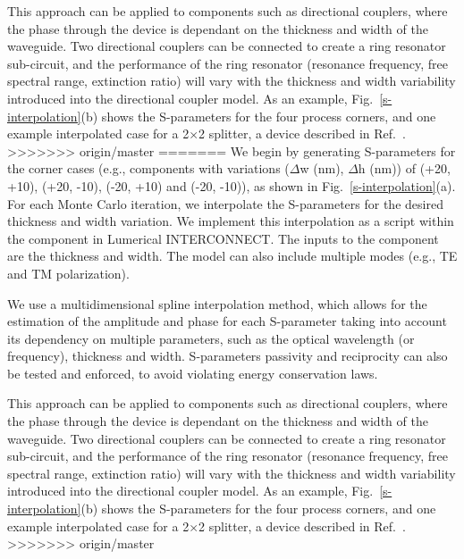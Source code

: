 \documentclass[journal]{spie}
\begin{document}
This approach can be applied to components such as directional couplers, where the phase through the device is dependant on the thickness and width of the waveguide.  Two directional couplers can be connected to create a ring resonator sub-circuit, and the performance of the ring resonator (resonance frequency, free spectral range, extinction ratio) will vary with the thickness and width variability introduced into the directional coupler model.  As an example, Fig.~\ref{s-interpolation}(b) shows the S-parameters for the four process corners, and one example interpolated case for a 2$\times$2 splitter, a device described in Ref.~. 
>>>>>>> origin/master
=======
We begin by generating S-parameters for the corner cases (e.g., components with variations ($\Delta$w (nm), $\Delta$h (nm)) of (+20, +10), (+20, -10), (-20, +10) and (-20, -10)), as shown in Fig.~\ref{s-interpolation}(a).  For each Monte Carlo iteration, we interpolate the S-parameters for the desired thickness and width variation.  We implement this interpolation as a script within the component in Lumerical INTERCONNECT.  The inputs to the component are the thickness and width.
The model can also include multiple modes (e.g., TE and TM polarization).

We use a multidimensional spline interpolation method, which allows for the estimation of the amplitude and phase for each S-parameter taking into account its dependency on multiple parameters, such as the optical wavelength (or frequency), thickness and width.  S-parameters passivity and reciprocity can also be tested and enforced, to avoid violating energy conservation laws.  

This approach can be applied to components such as directional couplers, where the phase through the device is dependant on the thickness and width of the waveguide.  Two directional couplers can be connected to create a ring resonator sub-circuit, and the performance of the ring resonator (resonance frequency, free spectral range, extinction ratio) will vary with the thickness and width variability introduced into the directional coupler model.  As an example, Fig.~\ref{s-interpolation}(b) shows the S-parameters for the four process corners, and one example interpolated case for a 2$\times$2 splitter, a device described in Ref.~. 
>>>>>>> origin/master
\end{document}
